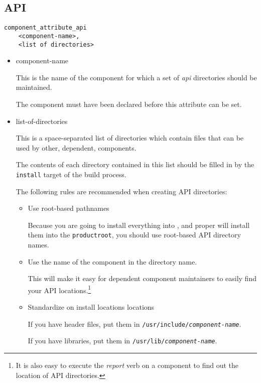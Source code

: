 \subsection{API}

\begin{verbatim}
component_attribute_api
    <component-name>,
    <list of directories>
\end{verbatim}

\begin{itemize}
\item component-name

  This is the name of the component for which a set of \emph{api}
  directories should be maintained.

  The component must have been declared before this attribute can be
  set.

\item list-of-directories

  This is a space-separated list of directories which contain files
  that can be used by other, dependent, components.

  The contents of each directory contained in this list should be
  filled in \destdir by the \texttt{install} target of the build
  process.

  The following rules are recommended when creating API directories:

  \begin{itemize}
    \item Use root-based pathnames

      Because you are going to install everything into \destdir, and
      \lmsbw proper will install them into the
      \texttt{productroot}, you
      should use root-based API directory names.

    \item Use the name of the component in the directory name.

      This will make it easy for dependent component maintainers to
      easily find your API locations.\footnote{It is also easy to
        execute the \emph{report} verb on a component to find out
        the location of API directories.}

    \item Standardize on install locations locations

      If you have header files, put them in
      \texttt{/usr/include/\emph{component-name}}.

      If you have libraries, put them in
      \texttt{/usr/lib/\emph{component-name}}.


\end{itemize}
\end{itemize}
